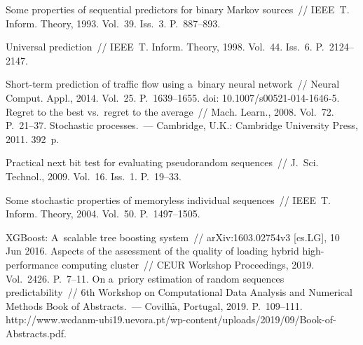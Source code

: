 \begin{multicols}{2}
{{\begin{thebibliography}{99}
 Some properties of sequential predictors for binary 
Markov sources~// IEEE~T. Inform. Theory, 1993. Vol.~39. Iss.~3. P.~887--893.

   Universal prediction~// IEEE~T. Inform. Theory, 1998. 
Vol.~44. Iss.~6. P.~2124--2147.

   Short-term prediction of 
traffic flow using a~binary neural network~// Neural Comput. Appl., 2014. Vol.~25. 
P.~1639--1655. doi: 10.1007/s00521-014-1646-5.
   Regret to the best vs.\ regret to the 
average~// Mach. Learn., 2008. Vol.~72.  
P.~21--37.
   Stochastic processes.~--- Cambridge, U.K.: Cambridge University Press, 2011. 
392~p.
  
   Practical next bit test for evaluating pseudorandom 
sequences~// J.~Sci. Technol., 
2009. Vol.~16. Iss.~1. P.~19--33.

   Some stochastic properties of memoryless individual 
  sequences~// IEEE~T. 
Inform. Theory, 2004. Vol.~50. P.~1497--1505. 

   XGBoost: A~scalable tree boosting system~// 
arXiv:1603.02754v3 [cs.LG], 10 Jun 2016.
   Aspects of the assessment of the 
quality of loading hybrid high-performance computing cluster~// CEUR Workshop Proceedings, 
2019. Vol.~2426. P.~7--11.
   On a~priory estimation of random sequences predictability~// 
  6th Workshop on Computational Data Analysis and Numerical Methods
  Book of Abstracts.~--- 
Covilh$\tilde{\mbox{a}}$, Portugal, 2019. P.~109--111. {\sf  
 http://www.wcdanm-ubi19.uevora.pt/wp-content/uploads/2019/09/Book-of-Abstracts.pdf}.
  
\end{thebibliography}

 }
 }

\end{multicols}


